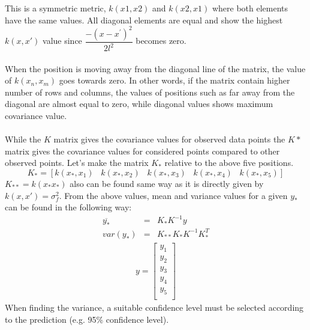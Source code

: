This is a symmetric metric, $k(x1,x2)$ and $k(x2,x1)$  where both elements have the same values. All diagonal elements are equal and show the highest $k(x,x')$ value since $ \dfrac{-(x-x^{'})^{2}}{2l^{2}} $  becomes zero.
\\\\
When the position is moving away from the diagonal line of the matrix, the value of $k(x_{n},x_{m})$ goes towards zero. In other words, if the matrix contain higher number of rows and columns, the values of positions such as far away from the diagonal are almost equal to zero, while diagonal values shows maximum covariance value.
\\\\
While the $K$ matrix gives the covariance values for observed data points the $K*$ matrix gives the covariance values for considered points compared to other observed points. Let’s make the matrix $K_{*}$ relative to the above five positions.
\begin{equation}
K_{*} = [k(x_{*},x_{1}) \hspace{10pt} k(x_{*},x_{2}) \hspace{10pt} k(x_{*},x_{3}) \hspace{10pt} k(x_{*},x_{4}) \hspace{10pt} k(x_{*},x_{5})]
\label{eq:referanceName}
\end{equation}
$K_{**}= k(x_{*} x_{*})$ also can be found same way as it is directly given by $k(x,x')=\sigma_{f}^{2}$. From the above values, mean and variance values for a given $y_{*}$ can be found in the following way:
\begin{eqnarray}
 \overline{y_{*}} &=& K_{*}K^{-1} y    \nonumber \\
 var(y_{*})&=& K_{**}K_{*}K^{-1}K_{*}^{T}
\end{eqnarray}
\begin{eqnarray}
y = 
\begin{bmatrix} 
y_{1} \\ y_{2} \\ y_{3} \\ y_{4} \\ y_{5} \\ \end{bmatrix}
\label{eq:k-matrix}
\end{eqnarray}
When finding the variance, a suitable confidence level must be selected according to the prediction (e.g. 95\% confidence level).
